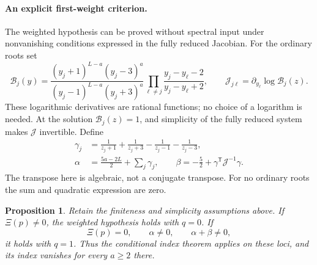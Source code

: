 \documentclass[11pt]{article}
\newtheorem{proposition}{Proposition}[section]
\theoremstyle{definition}
\begin{document}
\paragraph{An explicit first-weight criterion.}
The weighted hypothesis can be proved without spectral input under
nonvanishing conditions expressed in the fully reduced Jacobian.
For the ordinary roots set
\[
 \mathcal B_j(y)=
 \frac{(y_j+1)^{L-a}(y_j-3)^a}
      {(y_j-1)^{L-a}(y_j+3)^a}
 \prod_{\ell\ne j}\frac{y_j-y_\ell-2}{y_j-y_\ell+2},\qquad
 \mathcal J_{j\ell}=\partial_{y_\ell}\log\mathcal B_j(z).
\]
These logarithmic derivatives are rational functions; no choice of a
logarithm is needed. At the solution $\mathcal B_j(z)=1$, and simplicity
of the fully reduced system makes $\mathcal J$ invertible. Define
\begin{equation}\label{eq:jet-alpha-beta}
 \begin{aligned}
 \gamma_j&=\frac1{z_j+1}+\frac1{z_j+3}
                 -\frac1{z_j-1}-\frac1{z_j-3},\\
 \alpha&=\frac{5a-2L}{2}+\sum_j\gamma_j,\qquad
 \beta=-\frac52+\gamma^{\mathsf T}\mathcal J^{-1}\gamma.
 \end{aligned}
\end{equation}
The transpose here is algebraic, not a conjugate transpose. For no
ordinary roots the sum and quadratic expression are zero.

\begin{proposition}\label{prop:jet-first-weight-criterion}
Retain the finiteness and simplicity assumptions above.
If $\Xi(p)\ne0$, the weighted hypothesis holds with $q=0$.
If
\begin{equation}\label{eq:jet-resonant-open-conditions}
 \Xi(p)=0,\qquad \alpha\ne0,\qquad \alpha+\beta\ne0,
\end{equation}
it holds with $q=1$. Thus the conditional index theorem applies on
these loci, and its index vanishes for every $a\ge2$ there.
\end{proposition}
\end{document}
